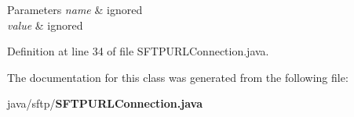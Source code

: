 \begin{DoxyParams}{Parameters}
{\em name} & ignored \\
\hline
{\em value} & ignored \\
\hline
\end{DoxyParams}


Definition at line 34 of file S\+F\+T\+P\+U\+R\+L\+Connection.\+java.



The documentation for this class was generated from the following file\+:\begin{DoxyCompactItemize}
\item 
java/sftp/{\bf S\+F\+T\+P\+U\+R\+L\+Connection.\+java}\end{DoxyCompactItemize}
